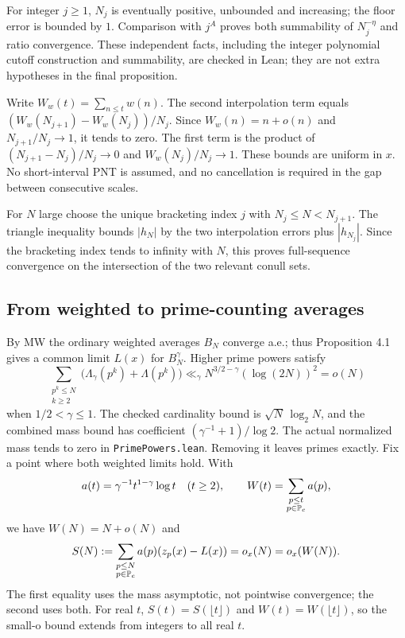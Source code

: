 For integer $j\geq1$, $N_j$ is eventually positive, unbounded and increasing; the floor error is bounded by $1$. Comparison with $j^A$ proves both summability of $N_j^{-\eta}$ and ratio convergence. These independent facts, including the integer polynomial cutoff construction and summability, are checked in Lean; they are not extra hypotheses in the final proposition.

Write $W_w(t)=\sum_{n\leq t}w(n)$. The second interpolation term equals $(W_w(N_{j+1})-W_w(N_j))/N_j$. Since $W_w(n)=n+o(n)$ and $N_{j+1}/N_j\to1$, it tends to zero. The first term is the product of $(N_{j+1}-N_j)/N_j\to0$ and $W_w(N_j)/N_j\to1$. These bounds are uniform in $x$. No short-interval PNT is assumed, and no cancellation is required in the gap between consecutive scales.

For $N$ large choose the unique bracketing index $j$ with $N_j\leq N<N_{j+1}$. The triangle inequality bounds $|h_N|$ by the two interpolation errors plus $|h_{N_j}|$. Since the bracketing index tends to infinity with $N$, this proves full-sequence convergence on the intersection of the two relevant conull sets.
\fi

\subsection*{From weighted to prime-counting averages}
By MW the ordinary weighted averages $B_N$ converge a.e.; thus Proposition 4.1 gives a common limit $L(x)$ for $B_N^\gamma$. Higher prime powers satisfy
\[
 \sum_{\substack{p^k\leq N\\k\geq2}}
 \bigl(\Lambda_\gamma(p^k)+\Lambda(p^k)\bigr)
 \ll_\gamma N^{3/2-\gamma}(\log(2N))^2=o(N)
\]
when $1/2<\gamma\leq1$. The checked cardinality bound is $\sqrt N\,\log_2N$, and the combined mass bound has coefficient $(\gamma^{-1}+1)/\log2$. The actual normalized mass tends to zero in \texttt{PrimePowers.lean}. Removing it leaves primes exactly.
\ifDetailed
Fix a point where both weighted limits hold. With
\[
 a(t)=\gamma^{-1}t^{1-\gamma}\log t\quad(t\geq2),\qquad
 W(t)=\sum_{\substack{p\leq t\\p\in\mathbb P_c}}a(p),
\]
we have $W(N)=N+o(N)$ and
\[
 S(N):=\sum_{\substack{p\leq N\\p\in\mathbb P_c}}a(p)(z_p(x)-L(x))=o_x(N)=o_x(W(N)).
\]
The first equality uses the mass asymptotic, not pointwise convergence; the second uses both. For real $t$, $S(t)=S(\lfloor t\rfloor)$ and $W(t)=W(\lfloor t\rfloor)$, so the small-o bound extends from integers to all real $t$.

